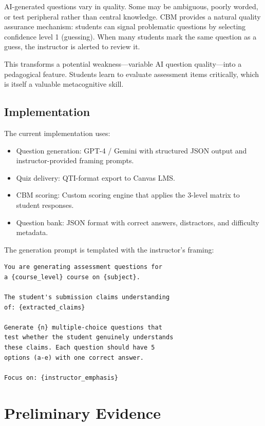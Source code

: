 \documentclass[sigconf]{acmart}
\begin{document}
AI-generated questions vary in quality. Some may be ambiguous, poorly worded, or test peripheral rather than central knowledge. CBM provides a natural quality assurance mechanism: students can signal problematic questions by selecting confidence level 1 (guessing). When many students mark the same question as a guess, the instructor is alerted to review it.

This transforms a potential weakness---variable AI question quality---into a pedagogical feature. Students learn to evaluate assessment items critically, which is itself a valuable metacognitive skill.

\subsection{Implementation}

The current implementation uses:
\begin{itemize}
    \item Question generation: GPT-4 / Gemini with structured JSON output and instructor-provided framing prompts.
    \item Quiz delivery: QTI-format export to Canvas LMS.
    \item CBM scoring: Custom scoring engine that applies the 3-level matrix to student responses.
    \item Question bank: JSON format with correct answers, distractors, and difficulty metadata.
\end{itemize}

The generation prompt is templated with the instructor's framing:

\begin{lstlisting}[language={}]
You are generating assessment questions for
a {course_level} course on {subject}.

The student's submission claims understanding
of: {extracted_claims}

Generate {n} multiple-choice questions that
test whether the student genuinely understands
these claims. Each question should have 5
options (a-e) with one correct answer.

Focus on: {instructor_emphasis}
\end{lstlisting}

\section{Preliminary Evidence}
\end{document}
